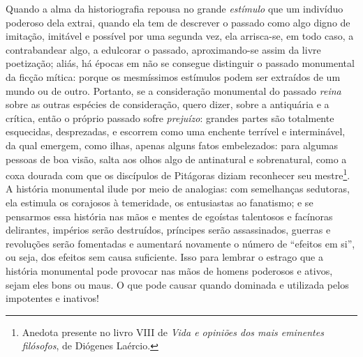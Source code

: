 Quando a alma da historiografia repousa no grande \emph{estímulo} que um
indivíduo poderoso dela extrai, quando ela tem de descrever o passado
como algo digno de imitação, imitável e possível por uma segunda vez,
ela arrisca-se, em todo caso, a contrabandear algo, a edulcorar o
passado, aproximando-se assim da livre poetização; aliás, há épocas em
não se consegue distinguir o passado monumental da ficção mítica: porque
os mesmíssimos estímulos podem ser extraídos de um mundo ou de outro.
Portanto, se a consideração monumental do passado \emph{reina} sobre as
outras espécies de consideração, quero dizer, sobre a antiquária e a
crítica, então o próprio passado sofre \emph{prejuízo}: grandes partes
são totalmente esquecidas, desprezadas, e escorrem como uma enchente
terrível e interminável, da qual emergem, como ilhas, apenas alguns
fatos embelezados: para algumas pessoas de boa visão, salta aos olhos
algo de antinatural e sobrenatural, como a coxa dourada com que os
discípulos de Pitágoras diziam reconhecer seu mestre\footnote{Anedota
  presente no livro VIII de \emph{Vida e opiniões dos mais eminentes
  filósofos}, de Diógenes Laércio.}. A história monumental ilude por
meio de analogias: com semelhanças sedutoras, ela estimula os corajosos
à temeridade, os entusiastas ao fanatismo; e se pensarmos essa história
nas mãos e mentes de egoístas talentosos e facínoras delirantes,
impérios serão destruídos, príncipes serão assassinados, guerras e
revoluções serão fomentadas e aumentará novamente o número de ``efeitos
em si'', ou seja, dos efeitos sem causa suficiente. Isso para lembrar o
estrago que a história monumental pode provocar nas mãos de homens
poderosos e ativos, sejam eles bons ou maus. O que pode causar quando
dominada e utilizada pelos impotentes e inativos!

